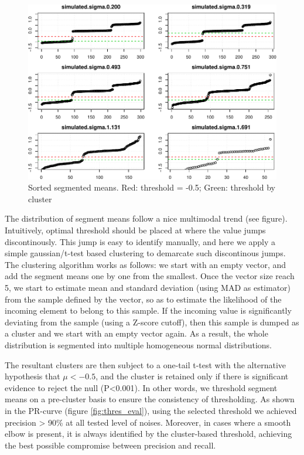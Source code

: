 \documentclass[]{article}
\begin{document}
\begin{figure}
\centering
\includegraphics{copynumber_files/figure-latex/DEBUG__seg_thres-1.pdf}
\caption{\label{fig:DEBUG_thres} Sorted segmented means. Red: threshold
= -0.5; Green: threshold by cluster}
\end{figure}

The distribution of segment means follow a nice multimodal trend (see
figure). Intuitively, optimal threshold should be placed at where the
value jumps discontinously. This jump is easy to identify manually, and
here we apply a simple gaussian/t-test based clustering to demarcate
such discontinous jumps. The clustering algorithm works as follows: we
start with an empty vector, and add the segment means one by one from
the smallest. Once the vector size reach 5, we start to estimate mean
and standard deviation (using MAD as estimator) from the sample defined
by the vector, so as to estimate the likelihood of the incoming element
to belong to this sample. If the incoming value is significantly
deviating from the sample (using a Z-score cutoff), then this sample is
dumped as a cluster and we start with an empty vector again. As a
result, the whole distribution is segmented into multiple homogeneous
normal distributions.

The resultant clusters are then subject to a one-tail t-test with the
alternative hypothesis that \(\mu < -0.5\), and the cluster is retained
only if there is significant evidence to reject the null
(P\textless{}0.001). In other words, we threshold segment means on a
pre-cluster basis to ensure the consistency of thresholding. As shown in
the PR-curve (figure \ref{fig:thres_eval}), using the selected threshold
we achieved precision \textgreater{} 90\% at all tested level of noises.
Moreover, in cases where a smooth elbow is present, it is always
identified by the cluster-based threshold, achieving the best possible
compromise between precision and recall.
\end{document}
